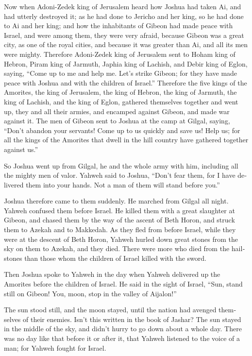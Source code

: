 \begin{paracol}{2}
\begin{otherlanguage}{english}
 Now when Adoni-Zedek king of Jerusalem heard how Joshua
had taken Ai, and had utterly destroyed it; as he had done to Jericho
and her king, so he had done to Ai and her king; and how the inhabitants
of Gibeon had made peace with Israel, and were among them,
 they were very afraid, because Gibeon was a great city,
as one of the royal cities, and because it was greater than Ai, and all
its men were mighty.  Therefore Adoni-Zedek king of
Jerusalem sent to Hoham king of Hebron, Piram king of Jarmuth, Japhia
king of Lachish, and Debir king of Eglon, saying,  ``Come
up to me and help me. Let's strike Gibeon; for they have made peace with
Joshua and with the children of Israel.''  Therefore the
five kings of the Amorites, the king of Jerusalem, the king of Hebron,
the king of Jarmuth, the king of Lachish, and the king of Eglon,
gathered themselves together and went up, they and all their armies, and
encamped against Gibeon, and made war against it.  The men
of Gibeon sent to Joshua at the camp at Gilgal, saying, ``Don't abandon
your servants! Come up to us quickly and save us! Help us; for all the
kings of the Amorites that dwell in the hill country have gathered
together against us.''

 So Joshua went up from Gilgal, he and the whole army with
him, including all the mighty men of valor.  Yahweh said
to Joshua, ``Don't fear them, for I have delivered them into your hands.
Not a man of them will stand before you.''

 Joshua therefore came to them suddenly. He marched from
Gilgal all night.  Yahweh confused them before Israel. He
killed them with a great slaughter at Gibeon, and chased them by the way
of the ascent of Beth Horon, and struck them to Azekah and to Makkedah.
 As they fled from before Israel, while they were at the
descent of Beth Horon, Yahweh hurled down great stones from the sky on
them to Azekah, and they died. There were more who died from the
hailstones than those whom the children of Israel killed with the sword.

 Then Joshua spoke to Yahweh in the day when Yahweh
delivered up the Amorites before the children of Israel. He said in the
sight of Israel, ``Sun, stand still on Gibeon! You, moon, stop in the
valley of Aijalon!''

 The sun stood still, and the moon stayed, until the
nation had avenged themselves of their enemies. Isn't this written in
the book of Jashar? The sun stayed in the middle of the sky, and didn't
hurry to go down about a whole day.  There was no day
like that before it or after it, that Yahweh listened to the voice of a
man; for Yahweh fought for Israel.


\end{otherlanguage}
\end{paracol}
